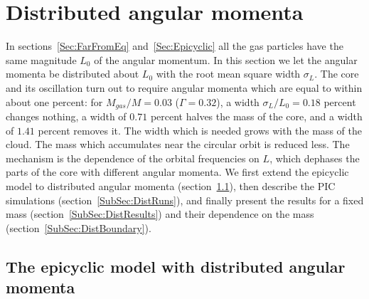\section{Distributed angular momenta}
\label{Sec:DistributedL}

In sections~\ref{Sec:FarFromEq} and~\ref{Sec:Epicyclic} all the gas particles have the same magnitude $L_0$ of the angular momentum. In this section we let the angular momenta be distributed about $L_0$ with the root mean square width $\sigma_L$. The core and its oscillation turn out to require angular momenta which are equal to within about one percent: for $M_{gas}/M = 0.03$ ($\Gamma = 0.32$), a width $\sigma_L/L_0 = 0.18$ percent changes nothing, a width of $0.71$ percent halves the mass of the core, and a width of $1.41$ percent removes it. The width which is needed grows with the mass of the cloud. The mass which accumulates near the circular orbit is reduced less. The mechanism is the dependence of the orbital frequencies on $L$, which dephases the parts of the core with different angular momenta. We first extend the epicyclic model to distributed angular momenta (section~\ref{SubSec:DistModel}), then describe the PIC simulations (section~\ref{SubSec:DistRuns}), and finally present the results for a fixed mass (section~\ref{SubSec:DistResults}) and their dependence on the mass (section~\ref{SubSec:DistBoundary}).


\subsection{The epicyclic model with distributed angular momenta}
\label{SubSec:DistModel}

